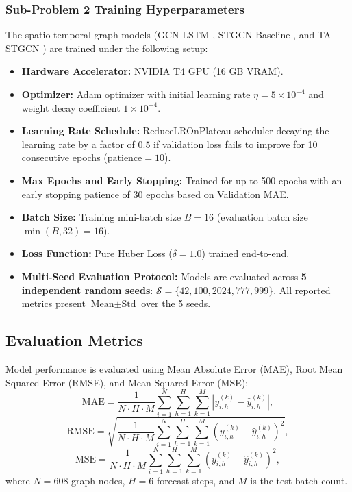 \subsubsection{Sub-Problem 2 Training Hyperparameters}
The spatio-temporal graph models (GCN-LSTM \cite{gcn, tgcn}, STGCN Baseline \cite{stgcn}, and TA-STGCN \cite{attention}) are trained under the following setup:
\begin{itemize}
    \item \textbf{Hardware Accelerator:} NVIDIA T4 GPU (16 GB VRAM).
    \item \textbf{Optimizer:} Adam optimizer \cite{adam} with initial learning rate $\eta = 5 \times 10^{-4}$ and weight decay coefficient $1 \times 10^{-4}$.
    \item \textbf{Learning Rate Schedule:} ReduceLROnPlateau scheduler decaying the learning rate by a factor of $0.5$ if validation loss fails to improve for 10 consecutive epochs ($\text{patience}=10$).
    \item \textbf{Max Epochs and Early Stopping:} Trained for up to 500 epochs with an early stopping patience of 30 epochs based on Validation MAE.
    \item \textbf{Batch Size:} Training mini-batch size $B = 16$ (evaluation batch size $\min(B, 32) = 16$).
    \item \textbf{Loss Function:} Pure Huber Loss \cite{huber} ($\delta = 1.0$) trained end-to-end.
    \item \textbf{Multi-Seed Evaluation Protocol:} Models are evaluated across \textbf{5 independent random seeds}: $\mathcal{S} = \{42, 100, 2024, 777, 999\}$. All reported metrics present $\text{Mean} \pm \text{Std}$ over the 5 seeds.
\end{itemize}

\subsection{Evaluation Metrics}

Model performance is evaluated using Mean Absolute Error (MAE), Root Mean Squared Error (RMSE), and Mean Squared Error (MSE):
\begin{equation}
\text{MAE} = \frac{1}{N \cdot H \cdot M} \sum_{i=1}^{N} \sum_{h=1}^{H} \sum_{k=1}^{M} \left| y_{i,h}^{(k)} - \hat{y}_{i,h}^{(k)} \right|,
\end{equation}
\begin{equation}
\text{RMSE} = \sqrt{ \frac{1}{N \cdot H \cdot M} \sum_{i=1}^{N} \sum_{h=1}^{H} \sum_{k=1}^{M} \left( y_{i,h}^{(k)} - \hat{y}_{i,h}^{(k)} \right)^2 },
\end{equation}
\begin{equation}
\text{MSE} = \frac{1}{N \cdot H \cdot M} \sum_{i=1}^{N} \sum_{h=1}^{H} \sum_{k=1}^{M} \left( y_{i,h}^{(k)} - \hat{y}_{i,h}^{(k)} \right)^2,
\end{equation}
where $N=608$ graph nodes, $H=6$ forecast steps, and $M$ is the test batch count.

